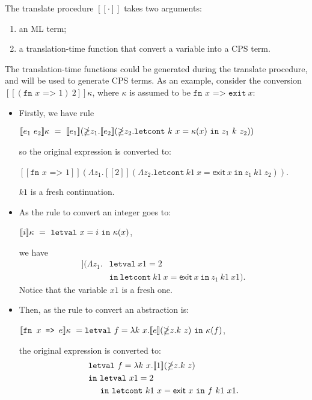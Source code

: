 \documentclass{article}
\theoremstyle{definition}
\theoremstyle{remark}
\numberwithin{equation}{section}
\begin{document}
The translate procedure $[\![\cdot]\!]$ takes two arguments:
\begin{enumerate}
\item an ML term;
\item a translation-time function that convert a variable into a CPS term.
\end{enumerate}

The translation-time functions could be generated during the translate procedure,
and will be used to generate CPS terms. As an example, consider the conversion
$[\![(\texttt{fn }x\texttt{ => }1)\ 2]\!]\kappa$, where $\kappa$ is assumed to
be $\texttt{fn }x\texttt{ => exit}\ x$:

\begin{itemize}
\item Firstly, we have rule
\begin{center}
$\env{e_1\ e_2} \  =\  [\![e_1]\!](\mathbb{\Lambda}z_1.[\![e_2]\!]
 (\mathbb{\Lambda}z_2.\texttt{letcont}\ k\ x=\kappa (x)\ \texttt{in}\ z_1\ k\ z_2))$
\end{center}
so the original expression is converted to:
\begin{center}
  $[\![\texttt{fn }x\texttt{ => }1]\!](\mathbb{\Lambda}z_1.[\![2]\!]
 (\mathbb{\Lambda}z_2.\texttt{letcont}\ k1\ x=
    \textsf{exit}\ x\ \texttt{in}\ z_1\ k1\ z_2))$.
\end{center}
$k1$ is a fresh continuation.

\item As the rule to convert an integer goes to:
\begin{center}
  $\env{i} \  =\  \texttt{letval}\ x=i\ \texttt{in}\ \kappa (x)$,
\end{center}
we have
\begin{align*}
  [\![\texttt{fn }x\texttt{ => }1]\!](\mathbb{\Lambda}z_1.&\texttt{letval}\ x1=2\\
   &\texttt{in}\ \texttt{letcont}\ k1\ x=\textsf{exit}\ x\ \texttt{in}\ z_1\ k1\ x1).
\end{align*}
Notice that the variable $x1$ is a fresh one.

\item Then, as the rule to convert an abstraction is:
\begin{center}
  $[\![\texttt{fn }x\texttt{ => }e]\!]\kappa\ =
        \texttt{letval}\ f=\lambda k\ x.[\![e]\!]
    (\mathbb{\Lambda}z.k\ z)\ \texttt{in}\ \kappa (f)$,
\end{center}
the original expression is converted to:
\begin{align*}
  &\texttt{letval}\ f=\lambda k\ x.[\![1]\!]
    (\mathbb{\Lambda}z.k\ z)\\
     &\texttt{in}\ \texttt{letval}\ x1=2\\
   &\kern0.5cm \texttt{in}\ \texttt{letcont}\ k1\ x=
    \textsf{exit}\ x\ \texttt{in}\ f\ k1\ x1.
\end{align*}


\end{itemize}
\end{document}
